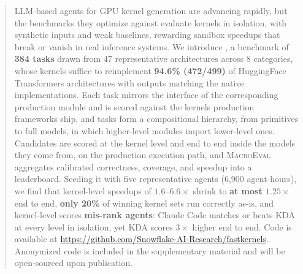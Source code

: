 \begin{abstract}
LLM-based agents for GPU kernel generation are advancing rapidly, but the benchmarks they optimize against evaluate kernels in isolation, with synthetic inputs and weak baselines, rewarding sandbox speedups that break or vanish in real inference systems.
We introduce \fastkernels{}, a benchmark of \textbf{384 tasks} drawn from 47 representative architectures across 8 categories, whose kernels suffice to reimplement \textbf{94.6\% (472/499)} of HuggingFace Transformers architectures with outputs matching the native implementations.
Each task mirrors the interface of the corresponding production module and is scored against the kernels production frameworks ship, and tasks form a compositional hierarchy, from primitives to full models, in which higher-level modules import lower-level ones.
Candidates are scored at the kernel level and end to end inside the models they come from, on the production execution path, and \textsc{MacroEval} aggregates calibrated correctness, coverage, and speedup into a leaderboard.
Seeding it with five representative agents (6{,}900 agent-hours), we find that kernel-level speedups of $1.6$--$6.6\times$ shrink to \textbf{at most $1.25\times$} end to end, \textbf{only 20\%} of winning kernel sets run correctly as-is, and kernel-level scores \textbf{mis-rank agents}: Claude Code matches or beats KDA at every level in isolation, yet KDA scores $3\times$ higher end to end.
\ificlrfinal
Code is available at \url{https://github.com/Snowflake-AI-Research/fastkernels}.
\else
Anonymized code is included in the supplementary material and will be open-sourced upon publication.
\fi
\end{abstract}

